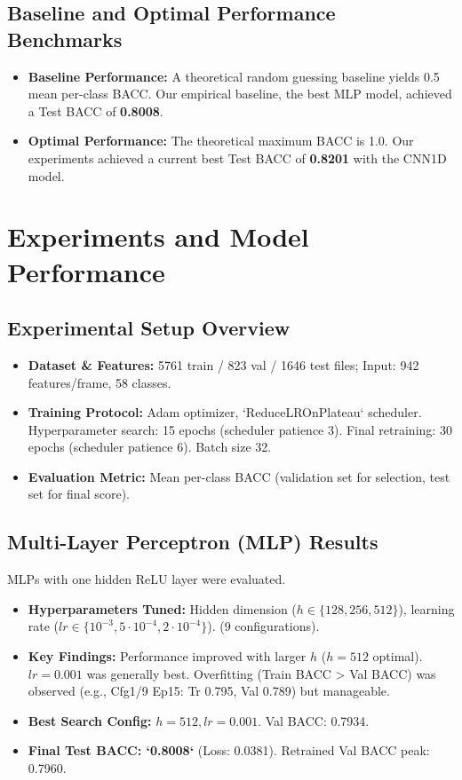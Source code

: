 \documentclass{article}
\begin{document}
\subsection{Baseline and Optimal Performance Benchmarks}
\begin{itemize}
    \item \textbf{Baseline Performance:} A theoretical random guessing baseline yields 0.5 mean per-class BACC. Our empirical baseline, the best MLP model, achieved a Test BACC of \textbf{0.8008}.
    \item \textbf{Optimal Performance:} The theoretical maximum BACC is 1.0. Our experiments achieved a current best Test BACC of \textbf{0.8201} with the CNN1D model.
\end{itemize}

\section{Experiments and Model Performance}
\label{sec:experiments}

\subsection{Experimental Setup Overview}
\begin{itemize}
    \item \textbf{Dataset \& Features:} 5761 train / 823 val / 1646 test files; Input: 942 features/frame, 58 classes.
    \item \textbf{Training Protocol:} Adam optimizer, `ReduceLROnPlateau` scheduler. Hyperparameter search: 15 epochs (scheduler patience 3). Final retraining: 30 epochs (scheduler patience 6). Batch size 32.
    \item \textbf{Evaluation Metric:} Mean per-class BACC (validation set for selection, test set for final score).
\end{itemize}

\subsection{Multi-Layer Perceptron (MLP) Results}
\label{ssec:mlp_results}
MLPs with one hidden ReLU layer were evaluated.
\begin{itemize}
    \item \textbf{Hyperparameters Tuned:} Hidden dimension ($h \in \{128, 256, 512\}$), learning rate ($lr \in \{10^{-3}, 5 \cdot 10^{-4}, 2 \cdot 10^{-4}\}$). (9 configurations).
    \item \textbf{Key Findings:} Performance improved with larger $h$ ($h=512$ optimal). $lr=0.001$ was generally best. Overfitting (Train BACC > Val BACC) was observed (e.g., Cfg1/9 Ep15: Tr 0.795, Val 0.789) but manageable.
    \item \textbf{Best Search Config:} $h=512, lr=0.001$. Val BACC: 0.7934.
    \item \textbf{Final Test BACC: `0.8008`} (Loss: 0.0381). Retrained Val BACC peak: 0.7960.
\end{itemize}
\end{document}
